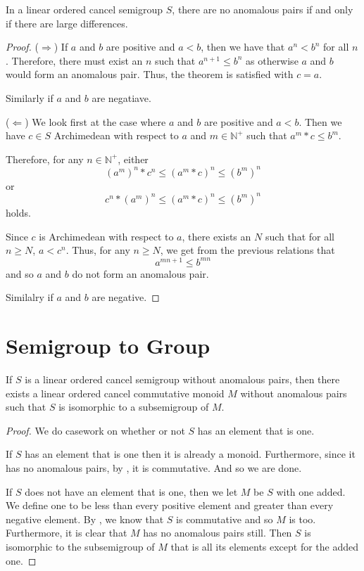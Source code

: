 \begin{theorem}\label{not_anomalous_iff_large_difference}
    \leanok
{}
In a linear ordered cancel semigroup $S$, there are no anomalous pairs
if and only if there are large differences.
\end{theorem}
\begin{proof}\leanok
($\Rightarrow$)
If $a$ and $b$ are positive and $a < b$, then we have that $a^n < b^n$ for all $n$.
Therefore, there must exist an $n$ such that $a^{n+1} \le b^n$
as otherwise $a$ and $b$ would form an anomalous pair.
Thus, the theorem is satisfied with $c = a$.

Similarly if $a$ and $b$ are negatiave.

($\Leftarrow$)
We look first at the case where $a$ and $b$ are positive and $a < b$.
Then we have $c\in S$ Archimedean with respect to $a$ and $m\in \mathbb{N}^+$ such that
$a^m * c \le b^m$.

Therefore, for any $n \in \mathbb{N}^+$,
either
\[(a^m)^n * c^n \le (a^m*c)^n \le (b^m)^n\]
or
\[c^n * (a^m)^n \le (a^m*c)^n \le (b^m)^n\]
holds.

Since $c$ is Archimedean with respect to $a$, there exists an $N$
such that for all $n \ge N$, $a < c^n$. Thus, for any $n \ge N$,
we get from the previous relations that
\[a^{mn + 1} \le b^{mn}\]
and so $a$ and $b$ do not form an anomalous pair.

Similalry if $a$ and $b$ are negative.
\end{proof}

\section{Semigroup to Group}

\begin{theorem}\label{to_not_anom_monoid}
    \leanok
    If $S$ is a linear ordered cancel semigroup
    without anomalous pairs, then there exists a
    linear ordered cancel commutative monoid $M$
    without anomalous pairs such that $S$ is isomorphic
    to a subsemigroup of $M$.
\end{theorem}
\begin{proof}\leanok
We do casework on whether or not $S$ has an element
that is one.

If $S$ has an element that is one then it is already
a monoid. Furthermore, since it has no anomalous pairs,
by , it is commutative.
And so we are done.

If $S$ does not have an element that is one,
then we let $M$ be $S$ with one added.
We define one to be less than every positive element and
greater than every negative element. By ,
we know that $S$ is commutative and so $M$ is too.
Furthermore, it is clear that $M$ has no anomalous pairs still.
Then $S$ is isomorphic to the subsemigroup of $M$
that is all its elements except for the added one.
\end{proof}


